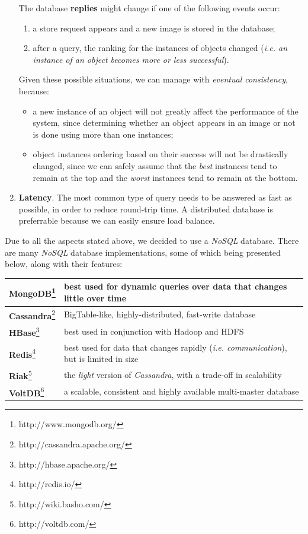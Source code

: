 \documentclass[a4paper,onecolumn,oneside,titlepage,11pt]{report}
\begin{document}
\begin{enumerate}
		The database \textbf{replies} might change if one of the following events occur:
		\begin{enumerate}
			\item a store request appears and a new image is stored in the database;
			\item after a query, the ranking for the instances of objects changed (\emph{i.e. an instance of an object becomes more or less successful}).
		\end{enumerate}
		Given these possible situations, we can manage with \emph{eventual consistency}, because:
		\begin{itemize}
			\item a new instance of an object will not greatly affect the performance of the system, since determining whether an object appears in an image or not is done using more than one instances;
			\item object instances ordering based on their success will not be drastically changed, since we can safely assume that the \emph{best} instances tend to remain at the top and the \emph{worst} instances tend to remain at the bottom.
		\end{itemize}
		\item \textbf{Latency}. The most common type of query needs to be answered as fast as possible, in order to reduce round-trip time. A distributed database is preferrable because we can easily ensure load balance.
	\end{enumerate}
	Due to all the aspects stated above, we decided to use a \emph{NoSQL} database. There are many \emph{NoSQL} database implementations, some of which being presented below, along with their features:
	\begin{center}
			\begin{tabularx}{\linewidth}{|l|X|}
				\hline
				\textbf{MongoDB}\footnote{http://www.mongodb.org/} & best used for dynamic queries over data that changes little over time\\
				\hline
				\textbf{Cassandra}\footnote{http://cassandra.apache.org/} & BigTable-like, highly-distributed, fast-write database\\
				\hline
				\textbf{HBase}\footnote{http://hbase.apache.org/} & best used in conjunction with Hadoop and HDFS\\
				\hline
				\textbf{Redis}\footnote{http://redis.io/} & best used for data that changes rapidly (\emph{i.e. communication}), but is limited in size\\
				\hline
				\textbf{Riak}\footnote{http://wiki.basho.com/} & the \emph{light} version of \emph{Cassandra}, with a trade-off in scalability\\
				\hline
				\textbf{VoltDB}\footnote{http://voltdb.com/} & a scalable, consistent and highly available multi-master database\\
				\hline
			\end{tabularx}
		\end{center}
\end{document}
